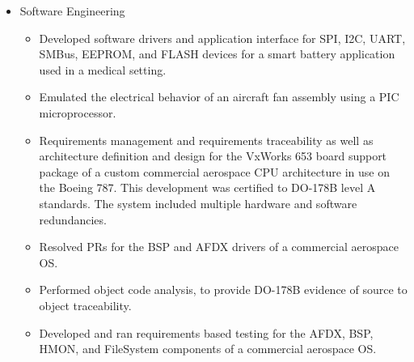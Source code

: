 \documentclass[print]{template/friggeri-cv} %
\begin{document}
\begin{entrylist}
{\begin{itemize}
\begin{itemize}
\item Implemented PSRAM, SRAM, SDRAM, DRAM, BT656, and Serial FLASH interfaces in an FPGA.
\item Developed the testbench, bus functional models, and/or testcases for several military FPGAs.
\item Developed a custom PCI target, to replace and emulate several obsolete hardware components on a custom PCI-CAN board used in a ventilator in a medical setting.
\item Obsolescence update of several FPGAs in various legacy military applications including a voice and data recorder and an inertial reference system.
\item Obsolescence update of several FPGAs in a fuel quantity measurement system in use on the Boeing 777.  This update was certified to DO-254 level A standards and was completed 50\% under budget.
\item Designed and implemented an FPGA SoC which provided control of an Ultrasonic Aspirator.  Both hardware and software of the SoC were used to drive the physical element and keep it at resonance.  Through creative use and cooperation of the SoC’s processor and FPGA fabric the BOM cost of the control system was greatly reduced.
\end{itemize}
\item Software Engineering
\begin{itemize}
\item Developed software drivers and application  interface for SPI, I2C, UART, SMBus, EEPROM, and FLASH devices for a smart battery application used in a medical setting.
\item Emulated the electrical behavior of an aircraft fan assembly using a PIC microprocessor.
\item Requirements management and requirements traceability as well as architecture definition and design for the VxWorks 653 board support package of a custom commercial aerospace CPU architecture in use on the Boeing 787.  This development was certified to DO-178B level A standards.  The system included multiple hardware and software redundancies.
\item Resolved PRs for the BSP and AFDX drivers of a commercial aerospace OS.
\item Performed object code analysis, to provide DO-178B evidence of source to object traceability.
\item Developed and ran requirements based testing for the AFDX, BSP, HMON, and FileSystem components of a commercial aerospace OS.

\end{itemize}
\end{itemize}}
\end{entrylist}
\end{document}
